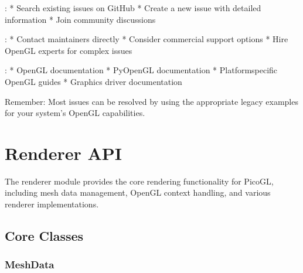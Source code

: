 \documentclass[a4paper,10pt,english,openany,oneside]{sphinxmanual}
\begin{document}
\sphinxAtStartPar
{}:
* Search existing issues on GitHub
* Create a new issue with detailed information
* Join community discussions

\sphinxAtStartPar
{}:
* Contact maintainers directly
* Consider commercial support options
* Hire OpenGL experts for complex issues

\sphinxAtStartPar
{}:
* OpenGL documentation
* PyOpenGL documentation
* Platform\sphinxhyphen{}specific OpenGL guides
* Graphics driver documentation

\sphinxAtStartPar
Remember: Most issues can be resolved by using the appropriate legacy examples for your system’s OpenGL capabilities.

\sphinxstepscope


\section{Renderer API}
\label{\detokenize{api/renderer:renderer-api}}\label{\detokenize{api/renderer::doc}}
\sphinxAtStartPar
The renderer module provides the core rendering functionality for PicoGL, including mesh data management, OpenGL context handling, and various renderer implementations.


\subsection{Core Classes}
\label{\detokenize{api/renderer:core-classes}}

\subsubsection{MeshData}
\label{\detokenize{api/renderer:meshdata}}
\end{document}
